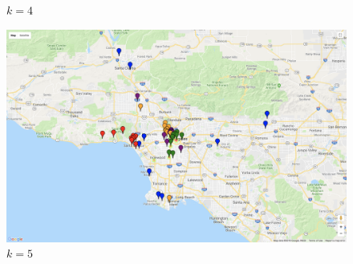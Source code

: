 \documentclass[11pt,letterpaper]{article}
\begin{document}
\begin{subfigures}
\begin{figure}[H]
  \caption{$k=4$}
\end{figure}
%
\begin{figure}[H]\centering
  \includegraphics[width=\linewidth, height=0.4\textheight]{k=5.png}
  \caption{$k=5$}
\end{figure}


\end{subfigures}
\end{document}
